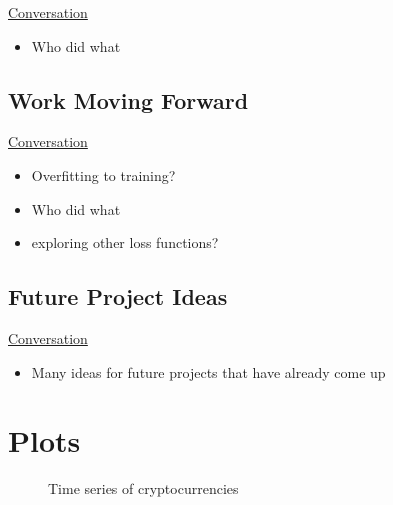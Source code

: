 \documentclass{article}
\begin{document}
\underline{Conversation}
\begin{itemize}
\item Who did what
\end{itemize}

\subsection{Work Moving Forward}



\underline{Conversation}
\begin{itemize}
\item Overfitting to training?
\item Who did what
\item exploring other loss functions?
\end{itemize}

\subsection{Future Project Ideas}

\underline{Conversation}
\begin{itemize}
\item Many ideas for future projects that have already come up
\end{itemize}

\section{Plots}
\begin{figure}[H]
\centering
    
    \hspace{0mm}

    \hspace{0mm}
    \caption{Time series of cryptocurrencies}
\end{figure}
\end{document}
